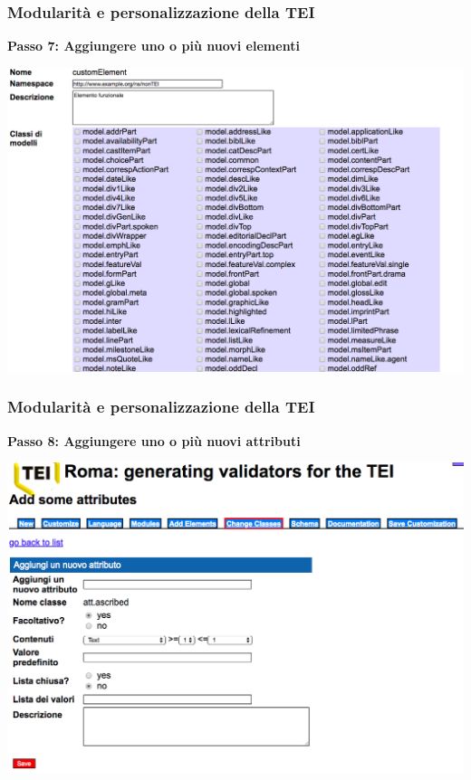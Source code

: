     
\begin{frame}
    \frametitle{Modularità e personalizzazione della TEI}
    \addtocounter{nframe}{1}
    
    \textbf{Passo 7: Aggiungere uno o più nuovi elementi}

     \begin{center}
        \includegraphics[width=.9\textwidth]{imgs/Roma9.png}
     \end{center}
    
\end{frame}
   
\begin{frame}
    \frametitle{Modularità e personalizzazione della TEI}
    \addtocounter{nframe}{1}
    
    \textbf{Passo 8: Aggiungere uno o più nuovi attributi}

     \begin{center}
        \includegraphics[width=.9\textwidth]{imgs/Roma14.png}
     \end{center}
     
    
\end{frame}
    
